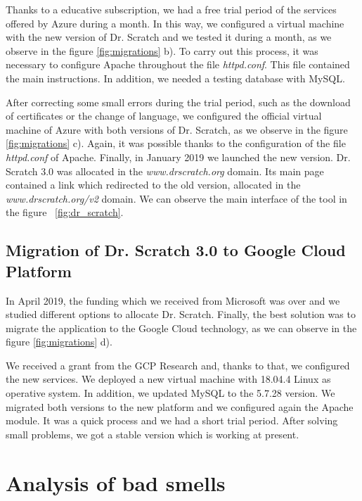 Thanks to a educative subscription, we had a free trial period of the services offered by Azure during a month. In this way, we configured a virtual machine with the new version of Dr. Scratch and we tested it during a month, as we observe in the figure \ref{fig:migrations} b). To carry out this process, it was necessary to configure Apache throughout the file \textit{httpd.conf}. This file contained the main instructions. In addition, we needed a testing database with MySQL.

After correcting some small errors during the trial period, such as the download of certificates or the change of language,  we configured the official virtual machine of Azure with both versions of Dr. Scratch, as we observe in the figure \ref{fig:migrations} c). Again, it was possible thanks to the configuration of the file \textit{httpd.conf} of Apache. Finally, in January 2019 we launched the new version. Dr. Scratch 3.0 was allocated in the \textit{www.drscratch.org} domain. Its main page contained a link which redirected to the old version, allocated in the \textit{www.drscratch.org/v2} domain. We can observe the main interface of the tool in the figure ~\ref{fig:dr_scratch}.


\subsection{Migration of Dr. Scratch 3.0 to Google Cloud Platform}
\label{subsec:mig_to_google}

In April 2019, the funding which we received from Microsoft was over and we studied different options to allocate Dr. Scratch. Finally, the best solution was to migrate the application to the Google Cloud technology, as we can observe in the figure \ref{fig:migrations} d).
 
We received a grant from the GCP Research and, thanks to that, we configured the new services. We deployed a new virtual machine with 18.04.4 Linux as operative system. In addition, we updated MySQL to the 5.7.28 version. We migrated both versions to the new platform and we configured again the Apache module. It was a quick process and we had a short trial period. After solving small problems, we got a stable version which is working at present.


\section{Analysis of bad smells}
\label{sec:analysis}

